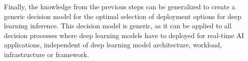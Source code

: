 Finally, the knowledge from the previous steps can be generalized to create a generic decision model for the optimal selection of deployment options for deep learning inference.
This decision model is generic, as it can be applied to all decision processes where deep learning models have to deployed for real-time AI applications, independent of deep learning model architecture, workload, infrastructure or framework.














\endinput 